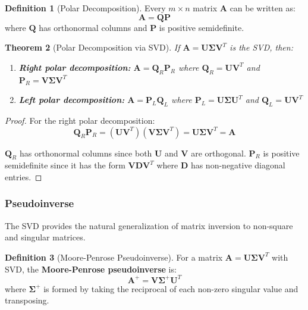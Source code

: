 \documentclass[12pt]{article}
\numberwithin{equation}{section}
\newcommand{\mat}[1]{\mathbf{#1}}        %
\theoremstyle{plain}
\newtheorem{theorem}{Theorem}[section]
\theoremstyle{definition}
\newtheorem{definition}[theorem]{Definition}
\theoremstyle{remark}
\begin{document}
\begin{definition}[Polar Decomposition]
Every $m \times n$ matrix $\mat{A}$ can be written as:
$$\mat{A} = \mat{Q}\mat{P}$$
where $\mat{Q}$ has orthonormal columns and $\mat{P}$ is positive semidefinite.
\end{definition}

\begin{theorem}[Polar Decomposition via SVD]
If $\mat{A} = \mat{U}\mat{\Sigma}\mat{V}^T$ is the SVD, then:
\begin{enumerate}
\item \textbf{Right polar decomposition:} $\mat{A} = \mat{Q}_R\mat{P}_R$ where $\mat{Q}_R = \mat{U}\mat{V}^T$ and $\mat{P}_R = \mat{V}\mat{\Sigma}\mat{V}^T$
\item \textbf{Left polar decomposition:} $\mat{A} = \mat{P}_L\mat{Q}_L$ where $\mat{P}_L = \mat{U}\mat{\Sigma}\mat{U}^T$ and $\mat{Q}_L = \mat{U}\mat{V}^T$
\end{enumerate}
\end{theorem}

\begin{proof}
For the right polar decomposition:
$$\mat{Q}_R\mat{P}_R = (\mat{U}\mat{V}^T)(\mat{V}\mat{\Sigma}\mat{V}^T) = \mat{U}\mat{\Sigma}\mat{V}^T = \mat{A}$$

$\mat{Q}_R$ has orthonormal columns since both $\mat{U}$ and $\mat{V}$ are orthogonal.
$\mat{P}_R$ is positive semidefinite since it has the form $\mat{V}\mat{D}\mat{V}^T$ where $\mat{D}$ has non-negative diagonal entries.
\end{proof}

\subsubsection{Pseudoinverse}

The SVD provides the natural generalization of matrix inversion to non-square and singular matrices.

\begin{definition}[Moore-Penrose Pseudoinverse]
For a matrix $\mat{A} = \mat{U}\mat{\Sigma}\mat{V}^T$ with SVD, the \textbf{Moore-Penrose pseudoinverse} is:
$$\mat{A}^+ = \mat{V}\mat{\Sigma}^+\mat{U}^T$$
where $\mat{\Sigma}^+$ is formed by taking the reciprocal of each non-zero singular value and transposing.
\end{definition}
\end{document}
